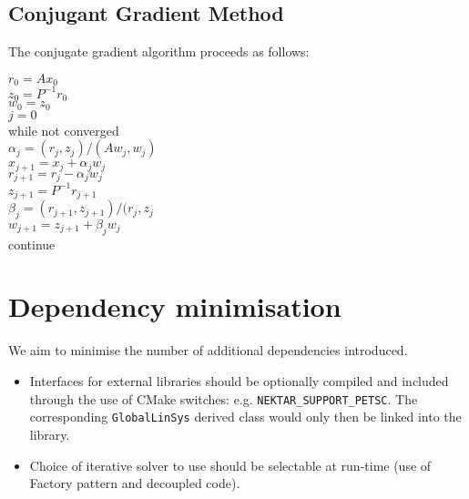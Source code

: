 \documentclass{article}
\begin{document}
\subsection{Conjugant Gradient Method}
The conjugate gradient algorithm proceeds as follows:
\begin{algorithm}
$r_0 = Ax_0$ \\
$z_0 = P^{-1}r_0$ \\
$w_0 = z_0$ \\
$j=0$ \\
while not converged \\
$\alpha_j = (r_j,z_j)/(Aw_j,w_j)$\\
$x_{j+1} = x_j + \alpha_j w_j$\\
$r_{j+1} = r_j - \alpha_j w_j$\\
$z_{j+1} = P^{-1} r_{j+1}$\\
$\beta_j = (r_{j+1},z_{j+1})/(r_j,z_j$\\
$w_{j+1} = z_{j+1} + \beta_j w_j$\\
continue
\end{algorithm}


\section{Dependency minimisation}
We aim to minimise the number of additional dependencies introduced.
\begin{itemize}
  \item Interfaces for external libraries should be optionally compiled and
  included through the use of CMake switches: e.g.
  \texttt{NEKTAR\_SUPPORT\_PETSC}. The corresponding \texttt{GlobalLinSys}
  derived class would only then be linked into the library.
  \item Choice of iterative solver to use should be selectable at run-time
  (use of Factory pattern and decoupled code).
\end{itemize}
\end{document}

